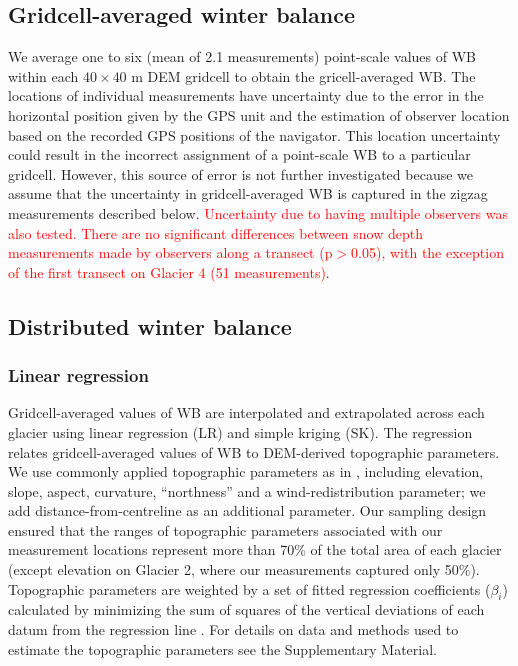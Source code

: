 \documentclass[twocolumn, letterpaper]{igs}
\begin{document}
\subsection{Gridcell-averaged winter balance}

We average one to six (mean of 2.1 measurements) point-scale values of WB within each $40 \times 40$ m DEM gridcell to obtain the gricell-averaged WB. The locations of individual measurements have  uncertainty due to the error in the horizontal position given by the GPS unit and the estimation of observer location based on the recorded GPS positions of the navigator. This location uncertainty could result in the incorrect assignment of a point-scale WB to a particular gridcell. However, this source of error is not further investigated because we assume that the uncertainty in gridcell-averaged WB is captured in the zigzag measurements described below. \textcolor{red}{Uncertainty due to having multiple observers was also tested. There are no significant differences between snow depth measurements made by observers along a transect (p$>$0.05), with the exception of the first transect on Glacier 4 (51 measurements)}. 

\subsection{Distributed winter balance}

\subsubsection{Linear regression}

Gridcell-averaged values of WB are interpolated and extrapolated across each glacier using linear regression (LR) and simple kriging (SK). The regression relates gridcell-averaged values of WB to DEM-derived topographic parameters. We use commonly applied topographic parameters as in \cite{McGrath2015}, including elevation, slope, aspect, curvature, ``northness'' and a wind-redistribution parameter; we add distance-from-centreline as an additional parameter. Our sampling design ensured that the ranges of topographic parameters associated with our measurement locations represent more than 70\% of the total area of each glacier (except elevation on Glacier 2, where our measurements captured only 50\%). Topographic parameters are weighted by a set of fitted regression coefficients ($\beta_i$) calculated by minimizing the sum of squares of the vertical deviations of each datum from the regression line \citep{Davis1986}. For details on data and methods used to estimate the topographic parameters see the Supplementary Material. 
\end{document}
